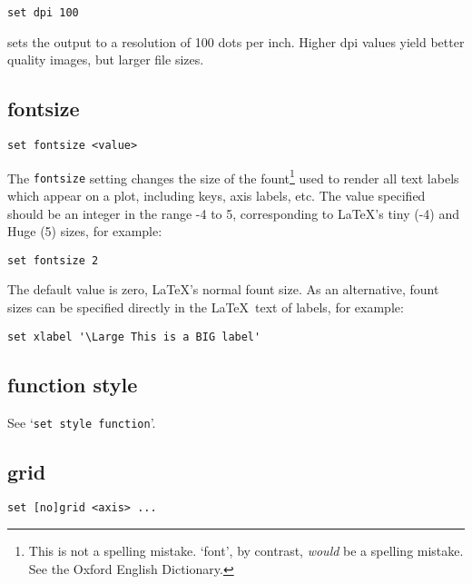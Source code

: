 \documentclass[a4paper,onecolumn,11pt]{book}
\begin{document}
\begin{verbatim}
set dpi 100
\end{verbatim}

\noindent sets the output to a resolution of 100 dots per inch. Higher dpi
values yield better quality images, but larger file sizes.

\subsection{fontsize}

\begin{verbatim}
set fontsize <value>
\end{verbatim}

The {\tt fontsize} setting changes the size of the fount\footnote{This is not a
spelling mistake. `font', by contrast, \textit{would} be a spelling mistake. See the
Oxford English Dictionary.} used to render all text labels which appear on a
plot, including keys, axis labels, etc. The value specified should be an integer
in the range -4 to 5, corresponding to \LaTeX's tiny (-4) and Huge (5) sizes,
for example:

\begin{verbatim}
set fontsize 2
\end{verbatim}

The default value is zero, \LaTeX's normal fount size. As an alternative, fount
sizes can be specified directly in the \LaTeX\ text of labels, for example:

\begin{verbatim}
set xlabel '\Large This is a BIG label'
\end{verbatim}

\subsection{function style}

See `{\tt set style function}'.

\subsection{grid}

\begin{verbatim}
set [no]grid <axis> ...
\end{verbatim}
\end{document}
